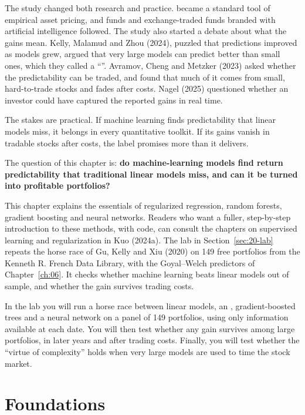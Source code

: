 The study changed both research and practice.  became a standard tool of empirical asset pricing, and funds and exchange-traded funds branded with artificial intelligence followed. The study also started a debate about what the gains mean. Kelly, Malamud and Zhou (2024), puzzled that predictions improved as models grew, argued that very large models can predict better than small ones, which they called a ``''. Avramov, Cheng and Metzker (2023) asked whether the predictability can be traded, and found that much of it comes from small, hard-to-trade stocks and fades after costs. Nagel (2025) questioned whether an investor could have captured the reported gains in real time.

The stakes are practical. If machine learning finds predictability that linear models miss, it belongs in every quantitative toolkit. If its gains vanish in tradable stocks after costs, the label promises more than it delivers. 

The question of this chapter is: \textbf{do machine-learning models find return predictability that traditional linear models miss, and can it be turned into profitable portfolios?}

This chapter explains the essentials of regularized regression, random forests, gradient boosting and neural networks. Readers who want a fuller, step-by-step introduction to these methods, with code, can consult the chapters on supervised learning and regularization in Kuo (2024a). The lab in Section~\ref{sec:20-lab} repeats the horse race of Gu, Kelly and Xiu (2020) on 149 free portfolios from the Kenneth R. French Data Library, with the Goyal--Welch predictors of Chapter~\ref{ch:06}. It checks whether machine learning beats linear models out of sample, and whether the gain survives trading costs.


In the lab you will run a horse race between linear models, an , gradient-boosted trees and a neural network on a panel of 149 portfolios, using only information available at each date. You will then test whether any gain survives among large portfolios, in later years and after trading costs. Finally, you will test whether the ``virtue of complexity'' holds when very large models are used to time the stock market.


\section{Foundations}
\label{sec:20-foundations}

